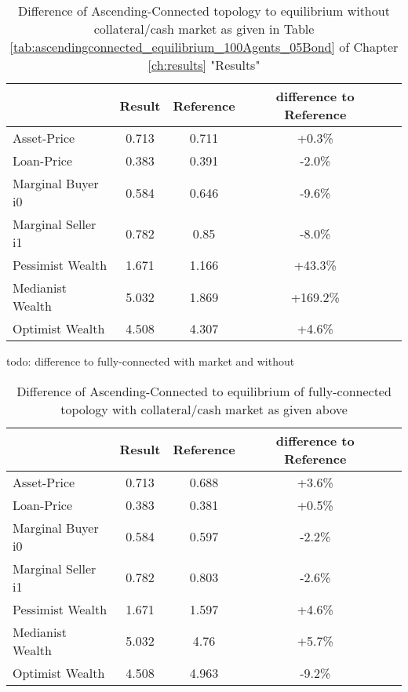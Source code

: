 \documentclass[Bachelorarbeit.tex]{subfiles}
\begin{document}
\begin{table}[H]
	\caption{Difference of Ascending-Connected topology to equilibrium without collateral/cash market as given in Table \ref{tab:ascendingconnected_equilibrium_100Agents_05Bond} of Chapter \ref{ch:results} "Results"}
	\centering
	\begin{tabular} { l c c c r }
		& Result & Reference & difference to Reference \\
		\hline
		Asset-Price & 0.713 & 0.711 & +0.3\% \\
		Loan-Price & 0.383 & 0.391 & -2.0\% \\
		Marginal Buyer i0 & 0.584 & 0.646 & -9.6\% \\
		Marginal Seller i1 & 0.782 & 0.85 & -8.0\% \\
		\hline
		Pessimist Wealth & 1.671 & 1.166 & +43.3\% \\
		Medianist Wealth & 5.032 & 1.869 & +169.2\% \\
		Optimist Wealth & 4.508 & 4.307 & +4.6\% \\
		\hline
	\end{tabular}
\end{table}

todo: difference to fully-connected with market and without

\begin{table}[H]
	\caption{Difference of Ascending-Connected to equilibrium of fully-connected topology with collateral/cash market as given above}
	\centering
	\begin{tabular} { l c c c r }
		& Result & Reference & difference to Reference \\
		\hline
		Asset-Price & 0.713 & 0.688 & +3.6\% \\
		Loan-Price & 0.383 & 0.381 & +0.5\% \\
		Marginal Buyer i0 & 0.584 & 0.597 & -2.2\% \\
		Marginal Seller i1 & 0.782 & 0.803 & -2.6\% \\
		\hline
		Pessimist Wealth & 1.671 & 1.597 & +4.6\% \\
		Medianist Wealth & 5.032 & 4.76 & +5.7\% \\
		Optimist Wealth & 4.508 & 4.963 & -9.2\% \\
		\hline
	\end{tabular}
\end{table}
\end{document}
